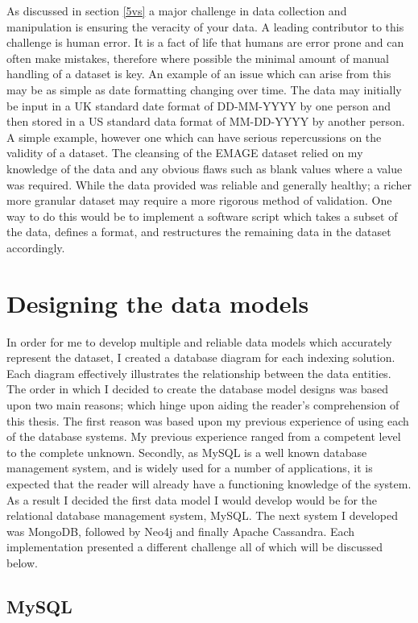 As discussed in section \ref{5vs} a major challenge in data collection and manipulation is ensuring the veracity of your data. A leading contributor to this challenge is human error. It is a fact of life that humans are error prone and can often make mistakes, therefore where possible the minimal amount of manual handling of a dataset is key. An example of an issue which can arise from this may be as simple as date formatting changing over time. The data may initially be input in a UK standard date format of DD-MM-YYYY by one person and then stored in a US standard data format of MM-DD-YYYY by another person. A simple example, however one which can have serious repercussions on the validity of a dataset. The cleansing of the EMAGE dataset relied on my knowledge of the data and any obvious flaws such as blank values where a value was required. While the data provided was reliable and generally healthy; a richer more granular dataset may require a more rigorous method of validation. One way to do this would be to implement a software script which takes a subset of the data, defines a format, and restructures the remaining data in the dataset accordingly.

\section{Designing the data models}\label{dbdesign}

In order for me to develop multiple and reliable data models which accurately represent the dataset, I created a database diagram for each indexing solution. Each diagram effectively illustrates the relationship between the data entities. The order in which I decided to create the database model designs was based upon two main reasons; which hinge upon aiding the reader's comprehension of this thesis. The first reason was based upon my previous experience of using each of the database systems. My previous experience ranged from a competent level to the complete unknown. Secondly, as MySQL is a well known database management system, and is widely used for a number of applications, it is expected that the reader will already have a functioning knowledge of the system. As a result I decided the first data model I would develop would be for the relational database management system, MySQL. The next system I developed was MongoDB, followed by Neo4j and finally Apache Cassandra. Each implementation presented a different challenge all of which will be discussed below.

\subsection{MySQL}\label{mysqldesign}

